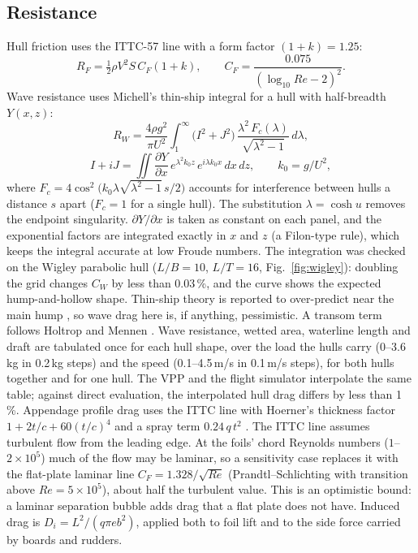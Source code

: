 \documentclass[10pt,twocolumn]{article}
\begin{document}
\subsection{Resistance}
Hull friction uses the ITTC-57 line with a form factor $(1+k)=1.25$:
\begin{equation}
R_F=\tfrac12\rho V^2 S\,C_F(1+k),\qquad C_F=\frac{0.075}{(\log_{10}Re-2)^2}.
\end{equation}
Wave resistance uses Michell's thin-ship integral \cite{michell,tuck,shipd} for a hull with half-breadth $Y(x,z)$:
\begin{equation}
R_W=\frac{4\rho g^2}{\pi U^2}\int_1^\infty \big(I^2+J^2\big)\,\frac{\lambda^2\,F_c(\lambda)}{\sqrt{\lambda^2-1}}\,d\lambda,
\end{equation}
\begin{equation}
I+iJ=\iint \frac{\partial Y}{\partial x}\,e^{\lambda^2k_0z}\,e^{i\lambda k_0x}\,dx\,dz,\qquad k_0=g/U^2,
\end{equation}
where $F_c=4\cos^2\!\big(k_0\lambda\sqrt{\lambda^2-1}\,s/2\big)$ accounts for interference between hulls a distance $s$ apart ($F_c=1$ for a single hull). The substitution $\lambda=\cosh u$ removes the endpoint singularity. $\partial Y/\partial x$ is taken as constant on each panel, and the exponential factors are integrated exactly in $x$ and $z$ (a Filon-type rule), which keeps the integral accurate at low Froude numbers. The integration was checked on the Wigley parabolic hull ($L/B=10$, $L/T=16$, Fig.~\ref{fig:wigley}): doubling the grid changes $C_W$ by less than 0.03\,\%, and the curve shows the expected hump-and-hollow shape. Thin-ship theory is reported to over-predict near the main hump \cite{tuck}, so wave drag here is, if anything, pessimistic. A transom term follows Holtrop and Mennen \cite{holtrop}. Wave resistance, wetted area, waterline length and draft are tabulated once for each hull shape, over the load the hulls carry (0--3.6\,kg in 0.2\,kg steps) and the speed (0.1--4.5\,m/s in 0.1\,m/s steps), for both hulls together and for one hull. The VPP and the flight simulator interpolate the same table; against direct evaluation, the interpolated hull drag differs by less than 1\,\%. Appendage profile drag uses the ITTC line with Hoerner's thickness factor $1+2t/c+60(t/c)^4$ and a spray term $0.24\,q\,t^2$ \cite{hoerner}. The ITTC line assumes turbulent flow from the leading edge. At the foils' chord Reynolds numbers ($1$--$2\times10^5$) much of the flow may be laminar, so a sensitivity case replaces it with the flat-plate laminar line $C_F=1.328/\sqrt{Re}$ (Prandtl--Schlichting with transition above $Re=5\times10^5$), about half the turbulent value. This is an optimistic bound: a laminar separation bubble adds drag that a flat plate does not have. Induced drag is $D_i=L^2/(q\pi e b^2)$, applied both to foil lift and to the side force carried by boards and rudders.
\end{document}
